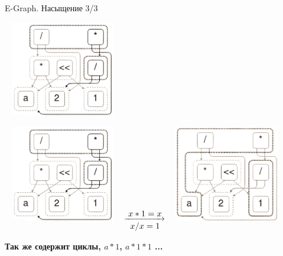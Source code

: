 \documentclass[aspectratio=169
  , xcolor={svgnames}
  , russian  %
  ]{beamer}
\begin{document}
\begin{frame}{E-Graph. Насыщение 3/3}
    {
        \begin{center}
            \includegraphics[width=5.2cm, height=4.2cm]{misc/egraphs_images/egraph_3.jpg}
        \end{center}
    }
    {
        \begin{center}
            \includegraphics[width=5.2cm, height=4.2cm]{misc/egraphs_images/egraph_3.jpg}
            \hspace{0.5cm}
            \raisebox{11.5ex}
            {$\xrightarrow[\text{\fontsize{10.4}{12} $x / x = 1$}]{\text{\fontsize{10.4}{12} $x * 1 = x$}}$}
            \hspace{0.5cm}
            \includegraphics[width=5.2cm, height=4.2cm]{misc/egraphs_images/egraphs4.jpg}

        \end{center}

        \begin{center}
           \textbf{Так же содержит циклы, $a * 1$, $a * 1 * 1$ ...} \\
        \end{center}

    }
\end{frame}
\end{document}
